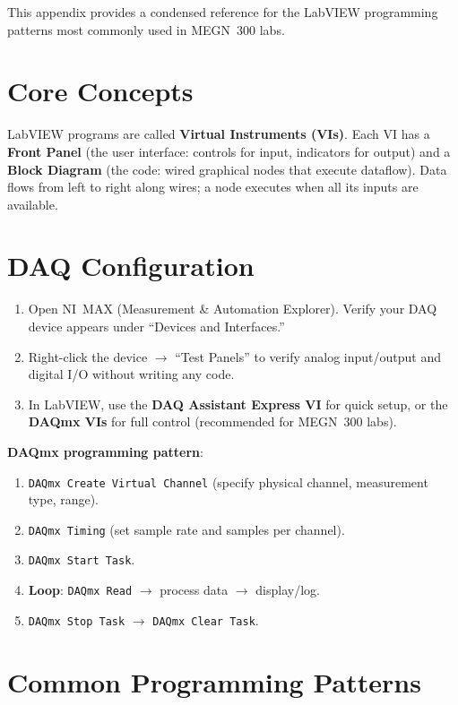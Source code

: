 \documentclass[11pt,letterpaper,twoside,openany]{book}
\begin{document}
This appendix provides a condensed reference for the LabVIEW programming patterns most commonly used in MEGN~300 labs.

\section*{Core Concepts}
LabVIEW programs are called \textbf{Virtual Instruments (VIs)}. Each VI has a \textbf{Front Panel} (the user interface: controls for input, indicators for output) and a \textbf{Block Diagram} (the code: wired graphical nodes that execute dataflow). Data flows from left to right along wires; a node executes when all its inputs are available.

\section*{DAQ Configuration}
\begin{enumerate}[leftmargin=1.5em]
\item Open NI~MAX (Measurement \& Automation Explorer). Verify your DAQ device appears under ``Devices and Interfaces.''
\item Right-click the device $\to$ ``Test Panels'' to verify analog input/output and digital I/O without writing any code.
\item In LabVIEW, use the \textbf{DAQ Assistant Express VI} for quick setup, or the \textbf{DAQmx VIs} for full control (recommended for MEGN~300 labs).
\end{enumerate}

\textbf{DAQmx programming pattern}:
\begin{enumerate}[nosep,leftmargin=1.5em]
\item \texttt{DAQmx Create Virtual Channel} (specify physical channel, measurement type, range).
\item \texttt{DAQmx Timing} (set sample rate and samples per channel).
\item \texttt{DAQmx Start Task}.
\item \textbf{Loop}: \texttt{DAQmx Read} $\to$ process data $\to$ display/log.
\item \texttt{DAQmx Stop Task} $\to$ \texttt{DAQmx Clear Task}.
\end{enumerate}

\section*{Common Programming Patterns}
\end{document}
